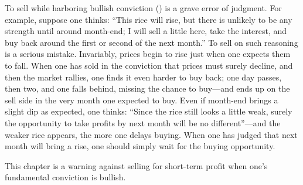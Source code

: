 
\begin{sokyubox}
{\small\itshape\color{sokyubar} }

\medskip
To sell while harboring bullish conviction () is a
grave error of judgment. For example, suppose one thinks: ``This rice
will rise, but there is unlikely to be any strength until around
month-end; I will sell a little here, take the interest, and buy back
around the first or second of the next month.'' To sell on such
reasoning is a serious mistake. Invariably, prices begin to rise just
when one expects them to fall. When one has sold in the conviction that
prices must surely decline, and then the market rallies, one finds it
even harder to buy back; one day passes, then two, and one falls behind,
missing the chance to buy---and ends up on the sell side in the very
month one expected to buy. Even if month-end brings a slight dip as
expected, one thinks: ``Since the rice still looks a little weak, surely
the opportunity to take profits by next month will be no different''---and
the weaker rice appears, the more one delays buying. When one has judged
that next month will bring a rise, one should simply wait for the buying
opportunity.
\end{sokyubox}

\commentary
This chapter is a warning against selling for short-term profit when
one's fundamental conviction is bullish.

